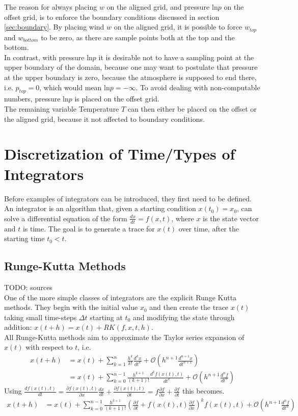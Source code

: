 The reason for always placing $w$ on the aligned grid, and pressure $\text{ln}p$ on the offset grid, is to enforce the boundary conditions discussed in section \ref{sec:boundary}.
By placing wind $w$ on the aligned grid, it is possible to force $w_{top}$ and $w_{bottom}$ to be zero, as there are sample points both at the top and the bottom.\\
In contrast, with pressure $\text{ln}p$ it is desirable not to have a sampling point at the upper boundary of the domain, because one may want to postulate that pressure at the upper boundary is zero, because the atmosphere is supposed to end there, i.e. $p_{top}=0$, which would mean $\text{ln}p = -\infty$.
To avoid dealing with non-computable numbers, pressure $\text{ln}p$ is placed on the offset grid.\\
The remaining variable Temperature $T$ can then either be placed on the offset or the aligned grid, because it not affected to boundary conditions.


\section{Discretization of Time/Types of Integrators}
Before examples of integrators can be introduced, they first need to be defined.
An integrator is an algorithm that, given a starting condition $x(t_0) = x_0$, can solve a differential equation of the form $\frac{dx}{dt} = f(x,t)$, where $x$ is the state vector and $t$ is time.
The goal is to generate a trace for $x(t)$ over time, after the starting time $t_0<t$.

\subsection{Runge-Kutta Methods}
TODO: sources\\
One of the more simple classes of integrators are the explicit Runge Kutta methods.
They begin with the initial value $x_0$ and then create the trace $x(t)$ taking small time-steps $\Delta t$ starting at $t_0$ and modifying the state through addition: $x(t+h) = x(t) + RK(f,x,t,h)$.\\
All Runge-Kutta methods aim to approximate the Taylor series expansion of $x(t)$ with respect to $t$, i.e.
\begin{align*}
x(t+h) &= x(t) + \sum_{k=1}^{n}\frac{h^k}{k!}\frac{d^kx}{dt^k} + \mathcal{O} \left(h^{n+1}\frac{d^{n+1}x}{dt^{n+1}}\right)\\
&= x(t)+ \sum_{k=0}^{n-1}\frac{h^{k+1}}{(k+1)!}\frac{d^kf(x(t),t)}{dt^k} + \mathcal{O}\left(h^{n+1}\frac{d^{n}f}{dt^{n}}\right)
\end{align*}
Using $\frac{df(x(t),t)}{dt} 
= \frac{\partial f(x(t),t)}{\partial x}\frac{dx}{dt}+\frac{\partial f(x(t),t)}{\partial t} 
= f\frac{\partial f}{\partial x}+\frac{\partial f}{\partial t}$
this becomes.
\begin{align*}
x(t+h) &= x(t)+ \sum_{k=0}^{n-1}\frac{h^{k+1}}{(k+1)!}\left(\frac{\partial f}{\partial t} + f(x(t),t)\frac{\partial f}{\partial x}\right)^kf(x(t),t) + \mathcal{O}\left(h^{n+1}\frac{d^{n}f}{dt^{n}}\right)
\end{align*}



